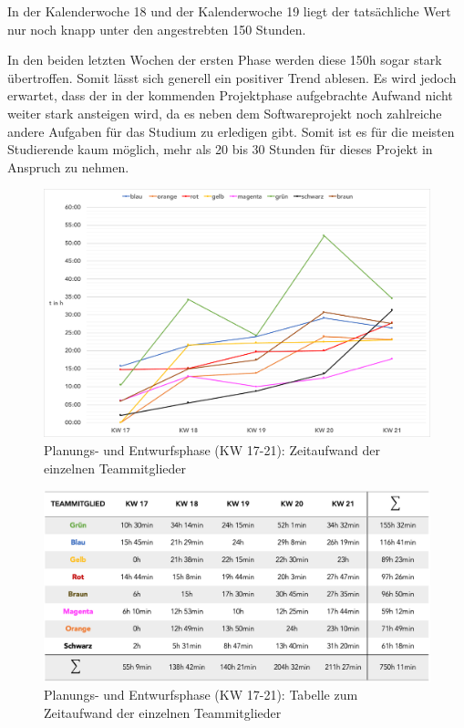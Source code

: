 \documentclass[../review_2.tex]{subfiles}
\begin{document}
In der Kalenderwoche 18 und der Kalenderwoche 19 liegt der tatsächliche Wert nur noch knapp unter den angestrebten 150 Stunden.

In den beiden letzten Wochen der ersten Phase werden diese 150h sogar stark übertroffen.
Somit lässt sich generell ein positiver Trend ablesen. Es wird jedoch erwartet, dass der in der kommenden Projektphase aufgebrachte Aufwand nicht weiter stark ansteigen wird, da es neben dem Softwareprojekt noch zahlreiche andere Aufgaben für das Studium zu erledigen gibt. Somit ist es für die meisten Studierende kaum möglich, mehr als 20 bis 30 Stunden für dieses Projekt in Anspruch zu nehmen.

\begin{figure} [h]
    \centering
    \includegraphics[width = \linewidth]{img/Kimai3.pdf}
    \caption{Planungs- und Entwurfsphase (KW 17-21): Zeitaufwand der einzelnen Teammitglieder}
    \label{teammitglieder}
\end{figure} 

\begin{figure} [h]
    \centering
    \includegraphics[width = \linewidth]{img/Kimai4.png}
    \caption{Planungs- und Entwurfsphase (KW 17-21): Tabelle zum Zeitaufwand der einzelnen Teammitglieder}
    \label{teammitglieder2}
\end{figure} 
\end{document}
